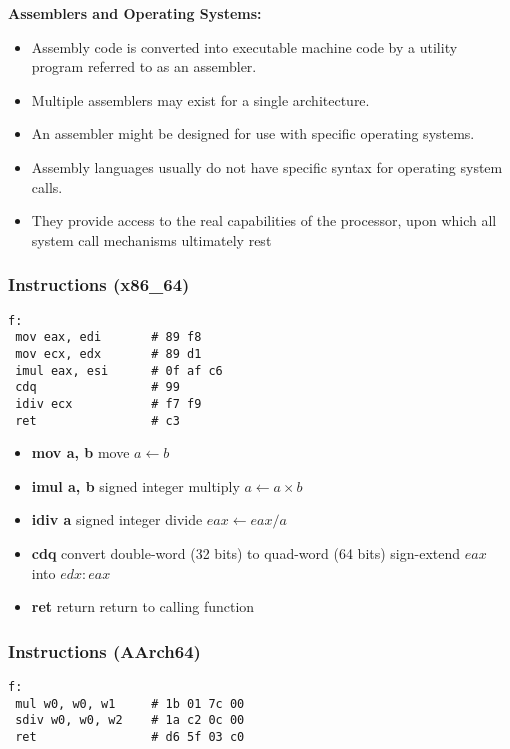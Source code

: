 \documentclass[12pt]{article}
\begin{document}
\textbf{Assemblers and Operating Systems:}
\begin{itemize}
    \item Assembly code is converted into executable machine code by a utility program referred to as an assembler.
    \item Multiple assemblers may exist for a single architecture.
    \item An assembler might be designed for use with specific operating systems.
    \item Assembly languages usually do not have specific syntax for operating system calls.
    \item They provide access to the real capabilities of the processor, upon which all system call mechanisms ultimately rest
\end{itemize}


\subsubsection{Instructions (x86\_64)}

\begin{verbatim}
f:
 mov eax, edi       # 89 f8
 mov ecx, edx       # 89 d1
 imul eax, esi      # 0f af c6
 cdq                # 99
 idiv ecx           # f7 f9
 ret                # c3
\end{verbatim}

\begin{itemize}
  \item \textbf{mov a, b} \qquad move \hfill $a \gets b$
  \item \textbf{imul a, b} \qquad signed integer multiply \hfill $a \gets a \times b$
  \item \textbf{idiv a} \qquad signed integer divide \hfill $eax \gets eax / a$
  \item \textbf{cdq} \qquad convert double-word (32 bits) to quad-word (64 bits) \hfill sign-extend $eax$ into $edx:eax$
  \item \textbf{ret} \qquad return \hfill return to calling function
\end{itemize}

\subsubsection{Instructions (AArch64)}

\begin{verbatim}
f:
 mul w0, w0, w1     # 1b 01 7c 00
 sdiv w0, w0, w2    # 1a c2 0c 00
 ret                # d6 5f 03 c0
\end{verbatim}
\end{document}
